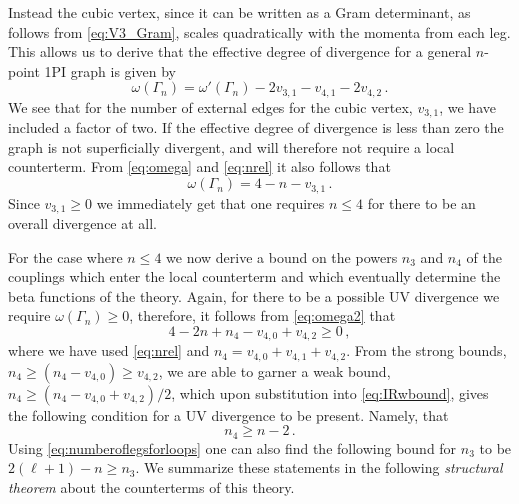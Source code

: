 \documentclass[a4paper,11pt]{article}
\begin{document}
Instead the cubic vertex, since it can be written as a Gram determinant, as follows from \cref{eq:V3_Gram}, scales quadratically with the momenta from each leg. This allows us to derive that the effective degree of divergence for a general $n$-point 1PI graph is given by
\begin{equation}
\label{eq:omega}
    \omega(\Gamma_n) =  \omega'(\Gamma_n) - 2v_{3,1} - v_{4,1} - 2v_{4,2} \,. 
\end{equation}
We see that for the number of external edges for the cubic vertex, $v_{3,1}$, we have included a factor of two. If the effective degree of divergence is less than zero the graph is not superficially divergent, and will therefore not require a local counterterm. 
From \cref{eq:omega} and \cref{eq:nrel} it also follows that
\begin{equation}\label{eq:omega2}
    \omega(\Gamma_n) = 4 - n - v_{3,1} \,. 
\end{equation}
Since $v_{3,1}\ge 0$ we immediately get that one requires $n\le 4$ for there to be an overall divergence at all. 

For the case where $n\le 4$ we now derive a bound on the powers $n_3$ and $n_4$ of the couplings which enter the local counterterm and which eventually determine the beta functions of the theory. Again, for there to be a possible UV divergence we require $\omega\left(\Gamma_n\right)\geq0$, therefore, it follows from \cref{eq:omega2} that 
\begin{equation} 
\label{eq:IRwbound}
    4 - 2n + n_4 - v_{4,0} + v_{4,2}  \ge 0  \,,
\end{equation}
where we have used \cref{eq:nrel} and $n_4 =  v_{4,0} + v_{4,1} + v_{4,2} $. From the strong bounds, $n_4 \geq (n_4 -v_{4,0}) \geq v_{4,2}$, we are able to garner a weak bound, $n_4 \geq (n_4 -v_{4,0}+v_{4,2})/2$, which upon substitution into \cref{eq:IRwbound}, gives the following condition for a UV divergence to be present. Namely, that
\begin{equation}
    n_4  \ge  n - 2 \,.
\end{equation}
Using \cref{eq:numberoflegsforloops} one can also find the following bound for $n_3$ to be $2(\ell+1)-n  \ge n_3 $.
We summarize these statements in the following \emph{structural theorem} about the counterterms of this theory.
\end{document}
